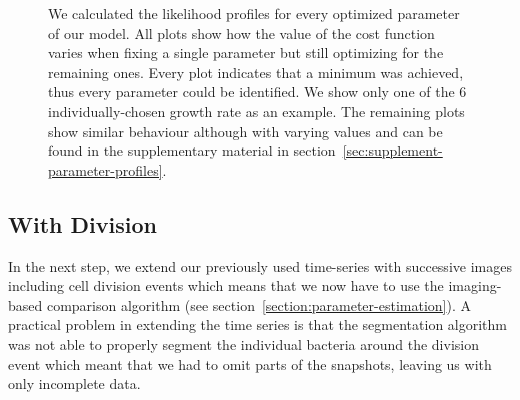 \documentclass{article}
\begin{document}
\begin{figure}[H]
\begin{tikzonimage}[width=0.25\textwidth]
    \end{tikzonimage}%
    \caption{
        We calculated the likelihood profiles for every optimized parameter of our model.
        All plots show how the value of the cost function varies when fixing a single parameter but
        still optimizing for the remaining ones.
        Every plot indicates that a minimum was achieved, thus every parameter could be identified.
        We show only one of the 6 individually-chosen growth rate as an example.
        The remaining plots show similar behaviour although with varying values and can be found in
        the supplementary material in section~\ref{sec:supplement-parameter-profiles}.
    }
    \label{fig:parameter-estimates-single-step}
\end{figure}

\subsection{With Division}

In the next step, we extend our previously used time-series with successive images including
cell division events which means that we now have to use the imaging-based comparison algorithm (see
section~\ref{section:parameter-estimation}).
A practical problem in extending the time series is that the segmentation algorithm was not able to
properly segment the individual bacteria around the division event which meant that we had to omit
parts of the snapshots, leaving us with only incomplete data.
\end{document}
